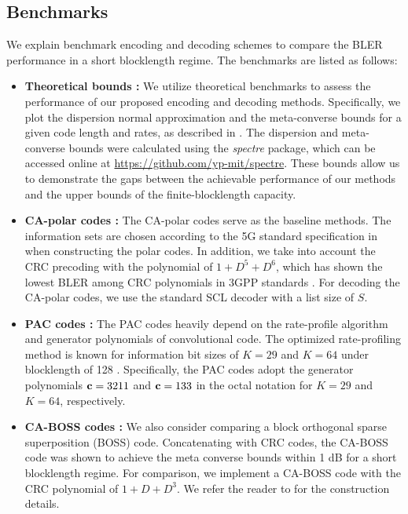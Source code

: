 \documentclass[conference]{IEEEtran}
\begin{document}
\subsection{Benchmarks}

We explain benchmark encoding and decoding schemes to compare the BLER performance in a short blocklength regime. The benchmarks  are listed as follows:
\begin{itemize}
\item {\bf Theoretical bounds \cite{polyanskiy-finite}:}  We utilize theoretical benchmarks to assess the performance of our proposed encoding and decoding methods. Specifically, we plot the dispersion normal approximation and the meta-converse bounds for a given code length and rates, as described in \cite{polyanskiy-finite}. The dispersion and meta-converse bounds were calculated using the {\it spectre} package, which can be accessed online at \url{https://github.com/yp-mit/spectre}. These bounds allow us to demonstrate the gaps between the achievable performance of our methods and the upper bounds of the finite-blocklength capacity.

	\item {\bf CA-polar codes \cite{3gpp-nr-coding}:} The CA-polar codes serve as the baseline methods. The information sets are chosen according to the 5G standard specification in \cite{3gpp-nr-coding} when constructing the polar codes. In addition, we take into account the CRC precoding with the polynomial of $1 + D^5 + D^6$, which has shown the lowest BLER among CRC polynomials in 3GPP standards \cite{3gpp-nr-coding}. For decoding the CA-polar codes, we use the standard SCL decoder with a list size of $S$.
	
	\item {\bf PAC codes  \cite{arikan-pac}:} The PAC codes heavily depend on the rate-profile algorithm and generator polynomials of convolutional code. The optimized rate-profiling method is known for information bit sizes of $K=29$ and $K=64$ under blocklength of 128 \cite{arikan-pac}. Specifically, the PAC codes adopt the generator polynomials ${\bf c} = 3211$ and ${\bf c} = 133$ in the octal notation for $K=29$ and $K=64$, respectively.
	 
	\item {\bf CA-BOSS codes \cite{BOSS-URLLC}:} We also consider comparing a block orthogonal sparse superposition (BOSS) code. Concatenating with CRC codes, the CA-BOSS code was shown to achieve the meta converse bounds within 1 dB for a short blocklength regime. For comparison, we implement a CA-BOSS code with the CRC polynomial of $1 + D + D^3$. We refer the reader to \cite{BOSS-URLLC} for the construction details.
\end{itemize}
\end{document}
